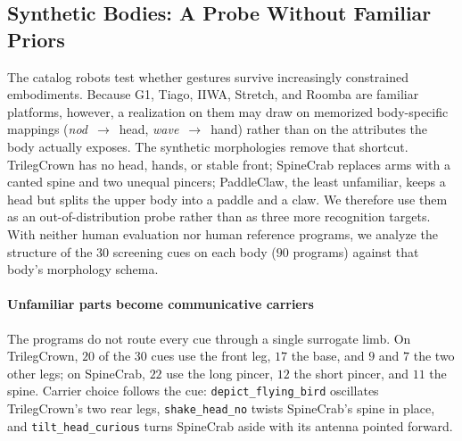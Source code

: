 
\subsection{Synthetic Bodies: A Probe Without Familiar Priors}
\label{sec:results-synthetic}
The catalog robots test whether gestures survive increasingly constrained embodiments. Because G1, Tiago, IIWA, Stretch, and Roomba are familiar platforms, however, a realization on them may draw on memorized body-specific mappings (\emph{nod}~$\rightarrow$~head, \emph{wave}~$\rightarrow$~hand) rather than on the attributes the body actually exposes. The synthetic morphologies remove that shortcut. TrilegCrown has no head, hands, or stable front; SpineCrab replaces arms with a canted spine and two unequal pincers; PaddleClaw, the least unfamiliar, keeps a head but splits the upper body into a paddle and a claw. We therefore use them as an out-of-distribution probe rather than as three more recognition targets. With neither human evaluation nor human reference programs, we analyze the structure of the 30 screening cues on each body ($90$ programs) against that body's morphology schema.


\paragraph{Unfamiliar parts become communicative carriers}
The programs do not route every cue through a single surrogate limb. On TrilegCrown, $20$ of the $30$ cues use the front leg, $17$ the base, and $9$ and $7$ the two other legs; on SpineCrab, $22$ use the long pincer, $12$ the short pincer, and $11$ the spine. Carrier choice follows the cue: \texttt{depict\_flying\_bird} oscillates TrilegCrown's two rear legs, \texttt{shake\_head\_no} twists SpineCrab's spine in place, and \texttt{tilt\_head\_curious} turns SpineCrab aside with its antenna pointed forward.

